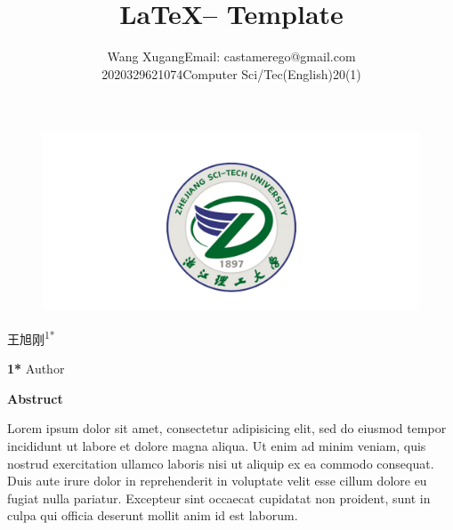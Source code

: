 \documentclass[twoside,11pt]{article}
\makeatletter
\newcommand\studentName{Wang Xugang}
\newcommand\studentEmail{Email: castamerego@gmail.com}
\newcommand\studentNumber{2020329621074}
\newcommand\studentClass{Computer Sci/Tec(English)20(1)}
\makeatother
\begin{document}

\begin{figure}[H]
    \centering
    \includegraphics[width=1\columnwidth]{figures/zstu-logo.png}
\end{figure}


\title{\Huge \LaTeX  -- Template}

\vspace{1cm}

\author{\name \studentName \email \studentEmail \\
    \studentNumber \class  \studentClass
    \addr
}

\maketitle

\newpage




\begin{center}
    王旭刚\textsuperscript{1*}

    \bigskip
    \textbf{1*} Author

    \bigskip
\end{center}






\begin{center}
    \Large\textbf{Abstruct}
\end{center}

Lorem ipsum dolor sit amet, consectetur adipisicing elit, sed do eiusmod tempor incididunt ut labore et dolore magna aliqua. Ut enim ad minim veniam, quis nostrud exercitation ullamco laboris nisi ut aliquip ex ea commodo consequat. Duis aute irure dolor in reprehenderit in voluptate velit esse cillum dolore eu fugiat nulla pariatur. Excepteur sint occaecat cupidatat non proident, sunt in culpa qui officia deserunt mollit anim id est laborum.
\end{document}
